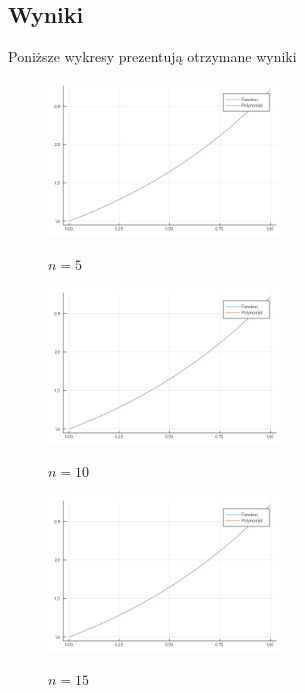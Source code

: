 \documentclass[12pt]{article}
\begin{document}
\subsection{Wyniki}
Poniższe wykresy prezentują otrzymane wyniki
	\begin{figure}[!htbp]
		\centering
		{\includegraphics[width=0.55\textwidth]{1.png}}
		\caption{$n=5$}
	\end{figure}	
	\begin{figure}[!htbp]
		\centering
		{\includegraphics[width=0.55\textwidth]{2.png}}
		\caption{$n=10$}
	\end{figure}		
	\begin{figure}[!htbp]
		\centering
		{\includegraphics[width=0.55\textwidth]{3.png}}
		\caption{$n=15$}
	\end{figure}	
\end{document}

